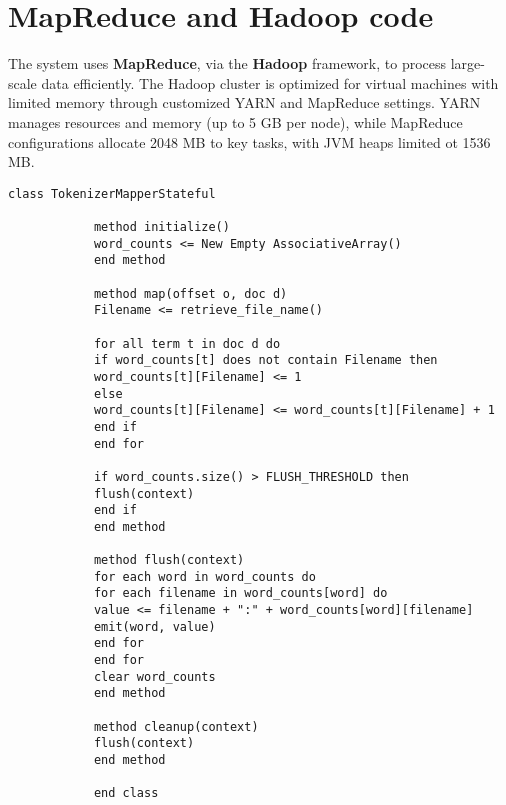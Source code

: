 \section{MapReduce and Hadoop code}
The system uses \textbf{MapReduce}, via the \textbf{Hadoop} framework, to process large-scale data efficiently. The Hadoop cluster is optimized for virtual machines with limited memory through customized YARN and MapReduce settings. YARN manages resources and memory (up to 5 GB per node), while MapReduce configurations allocate 2048 MB to key tasks, with JVM heaps limited ot 1536 MB.

\newpage 

\begin{center}
	\begin{minipage}{\linewidth}
		\begin{lstlisting}[language=PseudoCode]
			class TokenizerMapperStateful
			
			method initialize()
			word_counts <= New Empty AssociativeArray()
			end method
			
			method map(offset o, doc d)
			Filename <= retrieve_file_name()
			
			for all term t in doc d do
			if word_counts[t] does not contain Filename then
			word_counts[t][Filename] <= 1
			else
			word_counts[t][Filename] <= word_counts[t][Filename] + 1
			end if
			end for
			
			if word_counts.size() > FLUSH_THRESHOLD then
			flush(context)
			end if
			end method
			
			method flush(context)
			for each word in word_counts do
			for each filename in word_counts[word] do
			value <= filename + ":" + word_counts[word][filename]
			emit(word, value)
			end for
			end for
			clear word_counts
			end method
			
			method cleanup(context)
			flush(context)
			end method
			
			end class
		\end{lstlisting}
		\label{fig:pseudocode-stateful-mapper}
	\end{minipage}
\end{center}
